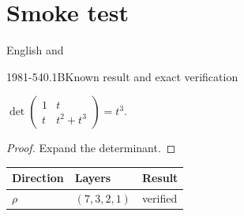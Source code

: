 \documentclass[11pt,oneside]{book}
\begin{document}
\chapter{Smoke test}
English and 
\begin{GSitem}{1981-540.1}{B}{Known result and exact verification}
\end{GSitem}
\begin{proposition}\ours
\(\det\left(\begin{smallmatrix}1&t\\t&t^2+t^3\end{smallmatrix}\right)=t^3\).
\end{proposition}
\begin{proof}Expand the determinant.\end{proof}
\begin{tabular}{lll}\toprule Direction&Layers&Result\\\midrule
\(\rho\)&\((7,3,2,1)\)&verified\\\bottomrule\end{tabular}


\end{document}
